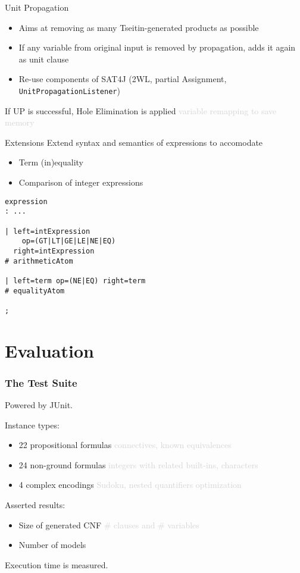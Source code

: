\documentclass[smaller,dvipsnames,ratio=169]{beamer}
\begin{document}
  \begin{frame}{Unit Propagation}
    \begin{itemize}
      \item Aims at removing as many Tseitin-generated products as possible
      \item If any variable from original input is removed by propagation, adds it again as unit clause
      \item Re-use components of SAT4J (2WL, partial Assignment, \texttt{UnitPropagationListener})
    \end{itemize}
    If UP is successful, \alert{Hole Elimination} is applied \textcolor{lightgray}{variable remapping to save memory}
  \end{frame}
  
  \begin{frame}[fragile]{Extensions}
    Extend syntax and semantics of expressions to accomodate
    \begin{itemize}
      \item Term (in)\alert{equality}
      \item \alert{Comparison} of integer expressions
    \end{itemize}
    \begin{verbatim}
expression
: ...

| left=intExpression
    op=(GT|LT|GE|LE|NE|EQ)
  right=intExpression
# arithmeticAtom

| left=term op=(NE|EQ) right=term
# equalityAtom

;
    \end{verbatim}
\end{frame}

  \section{Evaluation}

  \begin{frame}
    \frametitle{The Test Suite}
    Powered by \alert{JUnit}.

    Instance types:
    \begin{itemize}
      \item 22 propositional formulas \textcolor{lightgray}{connectives, known equivalences}
      \item 24 non-ground formulas \textcolor{lightgray}{integers with related built-ins, characters}
      \item 4 complex encodings \textcolor{lightgray}{Sudoku, nested quantifiers optimization}
    \end{itemize}
    Asserted results:
    \begin{itemize}
      \item \alert{Size} of generated CNF \textcolor{lightgray}{\# clauses and \# variables}
      \item Number of \alert{models}
    \end{itemize}
    Execution \alert{time} is measured.
  \end{frame}
\end{document}
